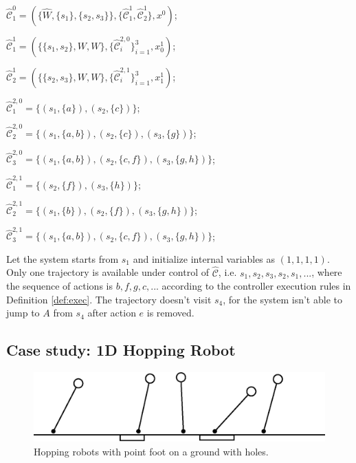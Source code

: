$ \widehat{\mathcal{C}}^0_1 = (\{\widehat{W},\{s_1\},\{s_2,s_3\}\},\{\widehat{\mathcal{C}}^1_1, \widehat{\mathcal{C}}^1_2\},x^0) $;

$ \widehat{\mathcal{C}}^1_1 = (\{\{s_1,s_2\},W,W\},\{\widehat{\mathcal{C}}^{2,0}_i\}_{i=1}^3, x^1_0)$;

$ \widehat{\mathcal{C}}^1_2 = (\{\{s_2,s_3\},W,W\},\{\widehat{\mathcal{C}}^{2,1}_i\}_{i=1}^{3}, x^1_1)$;

$ \widehat{\mathcal{C}}^{2,0}_1 = \{(s_1,\{a\}),(s_2,\{c\})\} $;

$ \widehat{\mathcal{C}}^{2,0}_2 = \{(s_1,\{a,b\}),(s_2,\{c\}),(s_3,\{g\})\} $;

$ \widehat{\mathcal{C}}^{2,0}_3 = \{(s_1,\{a,b\}),(s_2,\{c,f\}),(s_3,\{g,h\})\} $; 

$ \widehat{\mathcal{C}}^{2,1}_1 = \{(s_2,\{f\}),(s_3,\{h\})\} $;

$ \widehat{\mathcal{C}}^{2,1}_2 = \{(s_1,\{b\}),(s_2,\{f\}), (s_3,\{g,h\})\} $;

$ \widehat{\mathcal{C}}^{2,1}_3 = \{(s_1,\{a,b\}),(s_2,\{c,f\}),(s_3,\{g,h\})\} $;


Let the system starts from $ s_1 $ and initialize internal variables as $ (1,1,1,1) $. Only one trajectory is available under control of $\widehat{\mathcal{C}} $, i.e. $ s_1,s_2,s_3,s_2,s_1,...$, where the sequence of actions is $ b,f,g,c,... $ according to the controller execution rules in Definition \ref{def:exec}. The trajectory doesn't visit $ s_4 $, for the system isn't able to jump to $ A $ from $ s_4 $ after action $ e $ is removed.

\subsection{Case study: 1D Hopping Robot}

\begin{figure}
	\centering
	\includegraphics[width=0.8\linewidth]{pic/hop_rob}
	\caption{Hopping robots with point foot on a ground with holes.}
	\label{fig:hoprob}
\end{figure}


